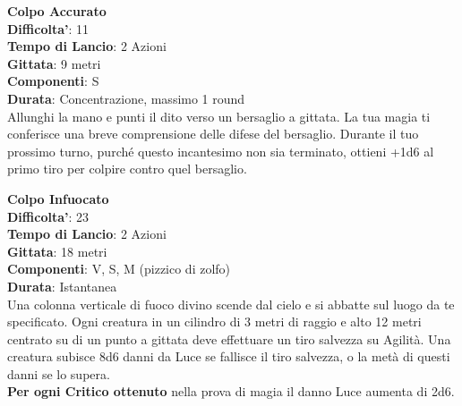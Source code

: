 \begin{multicols}{2}
\medskip\textbf{Colpo Accurato}\\
\textbf{Difficolta'}: 11\\
\textbf{Tempo di Lancio}: 2 Azioni\\
\textbf{Gittata}: 9 metri\\
\textbf{Componenti}: S\\
\textbf{Durata}: Concentrazione, massimo 1 round\\
Allunghi la mano e punti il dito verso un bersaglio a gittata. La tua magia ti conferisce una breve comprensione delle difese del bersaglio. Durante il tuo prossimo turno, purché questo incantesimo non sia terminato, ottieni +1d6 al primo tiro per colpire contro quel bersaglio.

\medskip\textbf{Colpo Infuocato}\\
\textbf{Difficolta'}: 23\\
\textbf{Tempo di Lancio}: 2 Azioni\\
\textbf{Gittata}: 18 metri\\
\textbf{Componenti}: V, S, M (pizzico di zolfo)\\
\textbf{Durata}: Istantanea\\
Una colonna verticale di fuoco divino scende dal cielo e si abbatte sul luogo da te specificato. Ogni creatura in un cilindro di 3 metri di raggio e alto 12 metri centrato su di un punto a gittata deve effettuare un tiro salvezza su Agilità. Una creatura subisce 8d6 danni da Luce se fallisce il tiro salvezza, o la metà di questi danni se lo supera.\\
\textbf{Per ogni Critico ottenuto} nella prova di magia il danno Luce aumenta di 2d6.


\end{multicols}
